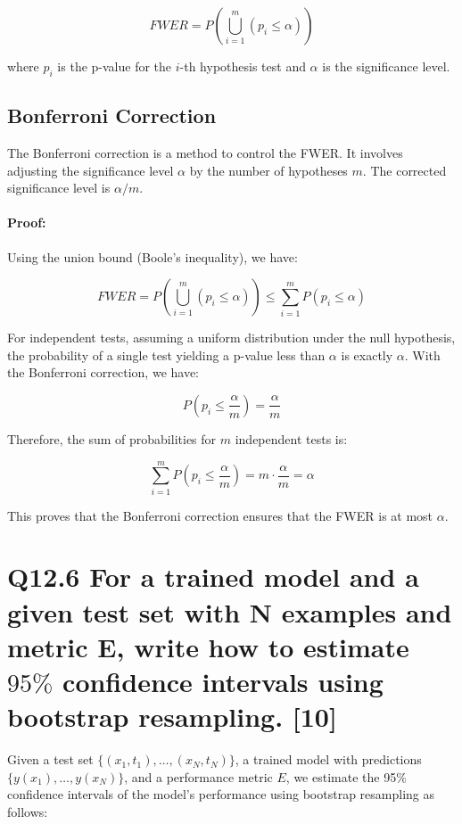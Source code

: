 \documentclass[11pt]{article}
\begin{document}
\[
FWER = P\left(\bigcup_{i=1}^{m} (p_i \leq \alpha)\right)
\]

where $p_i$ is the p-value for the $i$-th hypothesis test and $\alpha$ is the significance level.

\subsection*{Bonferroni Correction}

The Bonferroni correction is a method to control the FWER. It involves adjusting the significance level $\alpha$ by the number of hypotheses $m$. The corrected significance level is $\alpha/m$.

\paragraph{Proof:}

Using the union bound (Boole's inequality), we have:

\[
FWER = P\left(\bigcup_{i=1}^{m} (p_i \leq \alpha)\right) \leq \sum_{i=1}^{m} P(p_i \leq \alpha)
\]

For independent tests, assuming a uniform distribution under the null hypothesis, the probability of a single test yielding a p-value less than $\alpha$ is exactly $\alpha$. With the Bonferroni correction, we have:

\[
P(p_i \leq \frac{\alpha}{m}) = \frac{\alpha}{m}
\]

Therefore, the sum of probabilities for $m$ independent tests is:

\[
\sum_{i=1}^{m} P(p_i \leq \frac{\alpha}{m}) = m \cdot \frac{\alpha}{m} = \alpha
\]

This proves that the Bonferroni correction ensures that the FWER is at most $\alpha$.

\section{Q12.6 For a trained model and a given test set with N examples and metric E, write how to estimate $95\%$ confidence intervals using bootstrap resampling. [10]}

Given a test set $\{ (x_1, t_1), \ldots, (x_N, t_N) \}$, a trained model with predictions $\{ y(x_1), \ldots, y(x_N) \}$, and a performance metric $E$, we estimate the 95\% confidence intervals of the model's performance using bootstrap resampling as follows:
\end{document}
